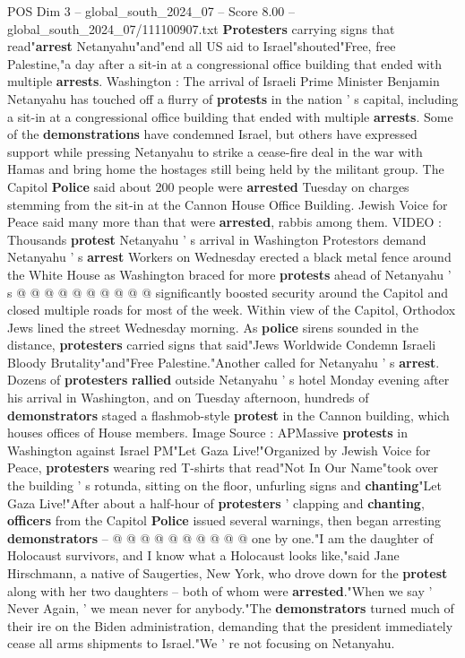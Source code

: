\begin{textsample}{POS Dim 3 – global\_south\_2024\_07 – Score 8.00 – global\_south\_2024\_07/111100907.txt}  \label{ex:f3_pos_317}
\textbf{Protesters} carrying signs that read"\textbf{arrest} Netanyahu"and"end all US aid to Israel"shouted"Free, free Palestine,"a day after a sit-in at a congressional office building that ended with multiple \textbf{arrests}.
Washington : The arrival of Israeli Prime Minister Benjamin Netanyahu has touched off a flurry of \textbf{protests} in the nation ' s capital, including a sit-in at a congressional office building that ended with multiple \textbf{arrests}.
Some of the \textbf{demonstrations} have condemned Israel, but others have expressed support while pressing Netanyahu to strike a cease-fire deal in the war with Hamas and bring home the hostages still being held by the militant group.
The Capitol \textbf{Police} said about 200 people were \textbf{arrested} Tuesday on charges stemming from the sit-in at the Cannon House Office Building.
Jewish Voice for Peace said many more than that were \textbf{arrested}, rabbis among them.
VIDEO : Thousands \textbf{protest} Netanyahu ' s arrival in Washington Protestors demand Netanyahu ' s \textbf{arrest} Workers on Wednesday erected a black metal fence around the White House as Washington braced for more \textbf{protests} ahead of Netanyahu ' s @ @ @ @ @ @ @ @ @ @ significantly boosted security around the Capitol and closed multiple roads for most of the week.
Within view of the Capitol, Orthodox Jews lined the street Wednesday morning.
As \textbf{police} sirens sounded in the distance, \textbf{protesters} carried signs that said"Jews Worldwide Condemn Israeli Bloody Brutality"and"Free Palestine."Another called for Netanyahu ' s \textbf{arrest}.
Dozens of \textbf{protesters} \textbf{rallied} outside Netanyahu ' s hotel Monday evening after his arrival in Washington, and on Tuesday afternoon, hundreds of \textbf{demonstrators} staged a flashmob-style \textbf{protest} in the Cannon building, which houses offices of House members.
Image Source : APMassive \textbf{protests} in Washington against Israel PM"Let Gaza Live!"Organized by Jewish Voice for Peace, \textbf{protesters} wearing red T-shirts that read"Not In Our Name"took over the building ' s rotunda, sitting on the floor, unfurling signs and \textbf{chanting}"Let Gaza Live!"After about a half-hour of \textbf{protesters} ' clapping and \textbf{chanting}, \textbf{officers} from the Capitol \textbf{Police} issued several warnings, then began arresting \textbf{demonstrators} -- @ @ @ @ @ @ @ @ @ @ one by one."I am the daughter of Holocaust survivors, and I know what a Holocaust looks like,"said Jane Hirschmann, a native of Saugerties, New York, who drove down for the \textbf{protest} along with her two daughters -- both of whom were \textbf{arrested}."When we say ' Never Again, ' we mean never for anybody."The \textbf{demonstrators} turned much of their ire on the Biden administration, demanding that the president immediately cease all arms shipments to Israel."We ' re not focusing on Netanyahu.

\end{textsample}

